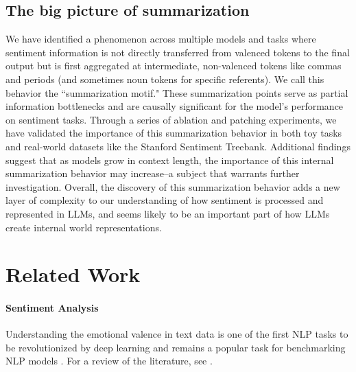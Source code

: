 \documentclass{article} %
\begin{document}
    \subsection{The big picture of summarization}
    We have identified a phenomenon across multiple models and tasks where sentiment information is not directly transferred from valenced tokens to the final output but is first aggregated at intermediate, non-valenced tokens like commas and periods (and sometimes noun tokens for specific referents). We call this behavior the ``summarization motif." These summarization points serve as partial information bottlenecks and are causally significant for the model's performance on sentiment tasks. Through a series of ablation and patching experiments, we have validated the importance of this summarization behavior in both toy tasks and real-world datasets like the Stanford Sentiment Treebank. Additional findings suggest that as models grow in context length, the importance of this internal summarization behavior may increase--a subject that warrants further investigation. Overall, the discovery of this summarization behavior adds a new layer of complexity to our understanding of how sentiment is processed and represented in LLMs, and seems likely to be an important part of how LLMs create internal world representations.


\section{Related Work}\label{related work}

\paragraph{Sentiment Analysis} Understanding the emotional valence in text data is one of the first NLP tasks to be revolutionized by deep learning \citep{treebank} and remains a popular task for benchmarking NLP models \citep{rosenthal-etal-2017-semeval, nakov-etal-2016-semeval, potts-etal-2020-dynasent, abraham-etal-2022-cebab}.  For a review of the literature, see \citep{Pang:2008,Liu_2012, Grimes:2014}. 
\end{document}
